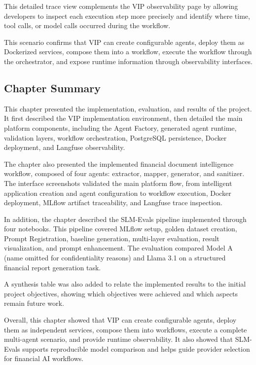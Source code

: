 This detailed trace view complements the VIP observability page by allowing developers to inspect each execution step more precisely and identify where time, tool calls, or model calls occurred during the workflow.


This scenario confirms that VIP can create configurable agents, deploy them as Dockerized services, compose them into a workflow, execute the workflow through the orchestrator, and expose runtime information through observability interfaces.



\subsection{Chapter Summary}

This chapter presented the implementation, evaluation, and results of the project. It first described the VIP implementation environment, then detailed the main platform components, including the Agent Factory, generated agent runtime, validation layers, workflow orchestration, PostgreSQL persistence, Docker deployment, and Langfuse observability.

The chapter also presented the implemented financial document intelligence workflow, composed of four agents: extractor, mapper, generator, and sanitizer. The interface screenshots validated the main platform flow, from intelligent application creation and agent configuration to workflow execution, Docker deployment, MLflow artifact traceability, and Langfuse trace inspection.

In addition, the chapter described the SLM-Evals pipeline implemented through four notebooks. This pipeline covered MLflow setup, golden dataset creation, Prompt Registration, baseline generation, multi-layer evaluation, result visualization, and prompt enhancement. The evaluation compared Model A (name omitted for confidentiality reasons) and Llama 3.1 on a structured financial report generation task.

A synthesis table was also added to relate the implemented results to the initial project objectives, showing which objectives were achieved and which aspects remain future work.

Overall, this chapter showed that VIP can create configurable agents, deploy them as independent services, compose them into workflows, execute a complete multi-agent scenario, and provide runtime observability. It also showed that SLM-Evals supports reproducible model comparison and helps guide provider selection for financial AI workflows.
